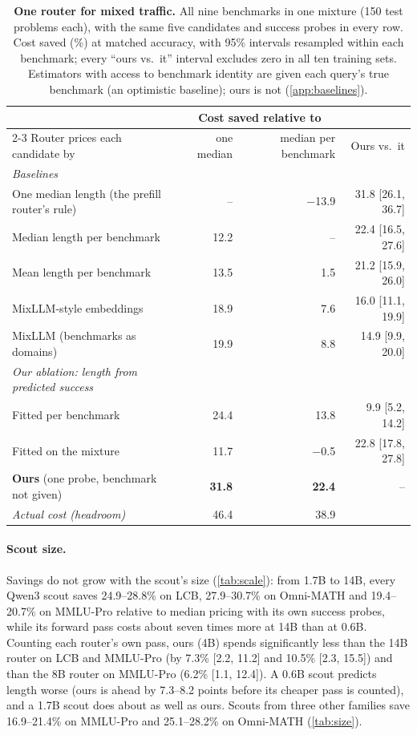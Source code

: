 \documentclass[10pt]{article}
\begin{document}
\begin{table}[t]
\centering
\footnotesize
\setlength{\tabcolsep}{4pt}
\begin{tabular}{lrrr}
\toprule
 & \multicolumn{2}{c}{Cost saved relative to} & \\
\cmidrule(lr){2-3}
Router prices each candidate by & one median & median per benchmark & Ours vs.\ it \\
\midrule
\emph{Baselines} & & & \\
One median length (the prefill router's rule) & -- & $-$13.9 & 31.8 [26.1, 36.7] \\
Median length per benchmark & 12.2 & -- & 22.4 [16.5, 27.6] \\
Mean length per benchmark & 13.5 & 1.5 & 21.2 [15.9, 26.0] \\
MixLLM-style embeddings & 18.9 & 7.6 & 16.0 [11.1, 19.9] \\
MixLLM (benchmarks as domains) & 19.9 & 8.8 & 14.9 [9.9, 20.0] \\
\midrule
\emph{Our ablation: length from predicted success} & & & \\
Fitted per benchmark & 24.4 & 13.8 & 9.9 [5.2, 14.2] \\
Fitted on the mixture & 11.7 & $-$0.5 & 22.8 [17.8, 27.8] \\
\midrule
\textbf{Ours} (one probe, benchmark not given) & \textbf{31.8} & \textbf{22.4} & -- \\
\midrule
\emph{Actual cost (headroom)} & 46.4 & 38.9 & \\
\bottomrule
\end{tabular}
\caption{\textbf{One router for mixed traffic.} All nine benchmarks in one mixture (150 test problems each), with the same five candidates and success probes in every row. Cost saved (\%) at matched accuracy, with 95\% intervals resampled within each benchmark; every ``ours vs.\ it'' interval excludes zero in all ten training sets. Estimators with access to benchmark identity are given each query's true benchmark (an optimistic baseline); ours is not (\cref{app:baselines}).}
\label{tab:mixed}
\end{table}

\paragraph{Scout size.}
Savings do not grow with the scout's size (\cref{tab:scale}): from 1.7B to 14B, every Qwen3 scout saves 24.9--28.8\% on LCB, 27.9--30.7\% on Omni-MATH and 19.4--20.7\% on MMLU-Pro relative to median pricing with its own success probes, while its forward pass costs about seven times more at 14B than at 0.6B. Counting each router's own pass, ours (4B) spends significantly less than the 14B router on LCB and MMLU-Pro (by 7.3\% [2.2, 11.2] and 10.5\% [2.3, 15.5]) and than the 8B router on MMLU-Pro (6.2\% [1.1, 12.4]). A 0.6B scout predicts length worse (ours is ahead by 7.3--8.2 points before its cheaper pass is counted), and a 1.7B scout does about as well as ours. Scouts from three other families save 16.9--21.4\% on MMLU-Pro and 25.1--28.2\% on Omni-MATH (\cref{tab:size}).
\end{document}
